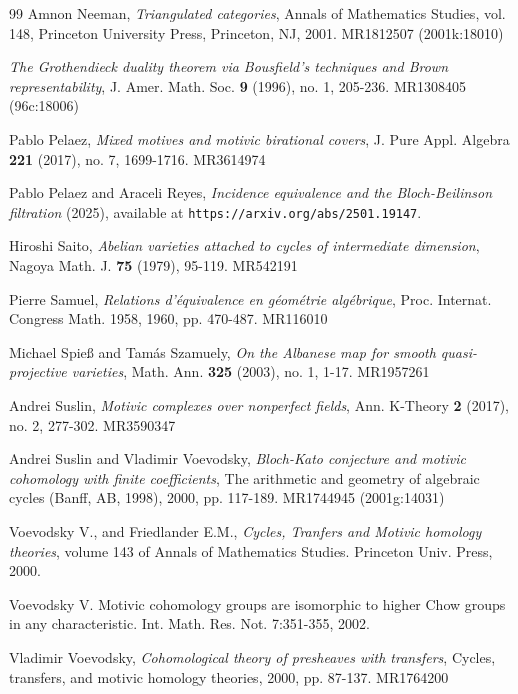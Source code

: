 \documentclass[10pt]{amsart}
\theoremstyle{definition}
\theoremstyle{remark}
\theoremstyle{definition}
\begin{document}
\begin{thebibliography}{99}
 Amnon Neeman, \textit{Triangulated categories}, Annals of Mathematics Studies, vol. 148, Princeton University Press, Princeton, NJ, 2001. MR1812507 (2001k:18010)

 \textit{The Grothendieck duality theorem via Bousfield's techniques and Brown representability}, J. Amer. Math. Soc. \textbf{9} (1996), no. 1, 205-236. MR1308405 (96c:18006)

 Pablo Pelaez, \textit{Mixed motives and motivic birational covers}, J. Pure Appl. Algebra \textbf{221} (2017), no. 7, 1699-1716. MR3614974

 Pablo Pelaez and Araceli Reyes, \textit{Incidence equivalence and the Bloch-Beilinson filtration} (2025), available at \texttt{https://arxiv.org/abs/2501.19147}.

 Hiroshi Saito, \textit{Abelian varieties attached to cycles of intermediate dimension}, Nagoya Math. J. \textbf{75} (1979), 95-119. MR542191

 Pierre Samuel, \textit{Relations d'\'equivalence en g\'eom\'etrie alg\'ebrique}, Proc. Internat. Congress Math. 1958, 1960, pp. 470-487. MR116010

 Michael Spie{\ss} and Tam\'as Szamuely, \textit{On the Albanese map for smooth quasi-projective varieties}, Math. Ann. \textbf{325} (2003), no. 1, 1-17. MR1957261

 Andrei Suslin, \textit{Motivic complexes over nonperfect fields}, Ann. K-Theory \textbf{2} (2017), no. 2, 277-302. MR3590347

 Andrei Suslin and Vladimir Voevodsky, \textit{Bloch-Kato conjecture and motivic cohomology with finite coefficients}, The arithmetic and geometry of algebraic cycles (Banff, AB, 1998), 2000, pp. 117-189. MR1744945 (2001g:14031)

 Voevodsky V., and Friedlander E.M., \textit{Cycles, Tranfers and Motivic homology theories}, volume 143 of Annals of Mathematics Studies. Princeton Univ. Press, 2000.

  Voevodsky V. Motivic cohomology groups are isomorphic to higher Chow groups in any characteristic. Int. Math. Res. Not. 7:351-355, 2002.

 Vladimir Voevodsky, \textit{Cohomological theory of presheaves with transfers}, Cycles, transfers, and motivic homology theories, 2000, pp. 87-137. MR1764200


\end{thebibliography}
\end{document}
